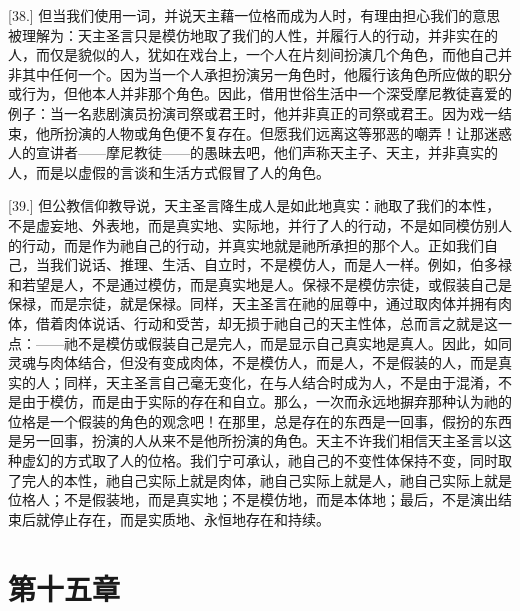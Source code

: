 \par

[38.] 但当我们使用一词，并说天主藉一位格而成为人时，有理由担心我们的意思被理解为：天主圣言只是模仿地取了我们的人性，并履行人的行动，并非实在的人，而仅是貌似的人，犹如在戏台上，一个人在片刻间扮演几个角色，而他自己并非其中任何一个。因为当一个人承担扮演另一角色时，他履行该角色所应做的职分或行为，但他本人并非那个角色。因此，借用世俗生活中一个深受摩尼教徒喜爱的例子：当一名悲剧演员扮演司祭或君王时，他并非真正的司祭或君王。因为戏一结束，他所扮演的人物或角色便不复存在。但愿我们远离这等邪恶的嘲弄！让那迷惑人的宣讲者——摩尼教徒——的愚昧去吧，他们声称天主子、天主，并非真实的人，而是以虚假的言谈和生活方式假冒了人的角色。\par

[39.] 但公教信仰教导说，天主圣言降生成人是如此地真实：祂取了我们的本性，不是虚妄地、外表地，而是真实地、实际地，并行了人的行动，不是如同模仿别人的行动，而是作为祂自己的行动，并真实地就是祂所承担的那个人。正如我们自己，当我们说话、推理、生活、自立时，不是模仿人，而是人一样。例如，伯多禄和若望是人，不是通过模仿，而是真实地是人。保禄不是模仿宗徒，或假装自己是保禄，而是宗徒，就是保禄。同样，天主圣言在祂的屈尊中，通过取肉体并拥有肉体，借着肉体说话、行动和受苦，却无损于祂自己的天主性体，总而言之就是这一点：——祂不是模仿或假装自己是完人，而是显示自己真实地是真人。因此，如同灵魂与肉体结合，但没有变成肉体，不是模仿人，而是人，不是假装的人，而是真实的人；同样，天主圣言自己毫无变化，在与人结合时成为人，不是由于混淆，不是由于模仿，而是由于实际的存在和自立。那么，一次而永远地摒弃那种认为祂的位格是一个假装的角色的观念吧！在那里，总是存在的东西是一回事，假扮的东西是另一回事，扮演的人从来不是他所扮演的角色。天主不许我们相信天主圣言以这种虚幻的方式取了人的位格。我们宁可承认，祂自己的不变性体保持不变，同时取了完人的本性，祂自己实际上就是肉体，祂自己实际上就是人，祂自己实际上就是位格人；不是假装地，而是真实地；不是模仿地，而是本体地；最后，不是演出结束后就停止存在，而是实质地、永恒地存在和持续。\par


\section{第十五章}

\par

